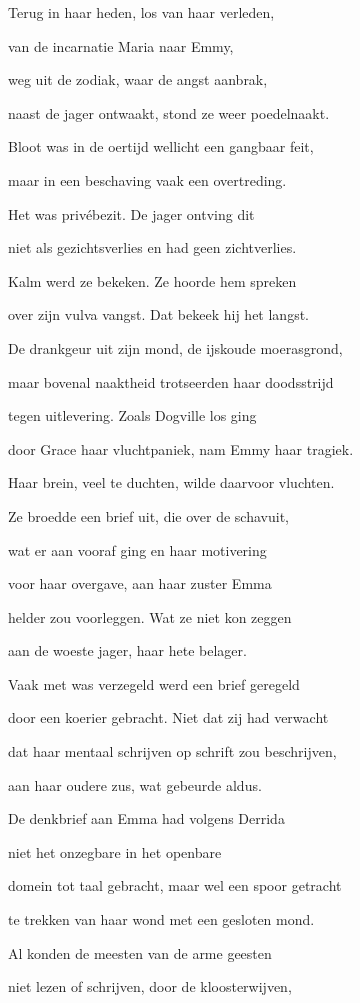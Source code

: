 Terug in haar heden,
los van haar verleden,

van de incarnatie
Maria naar Emmy,

weg uit de zodiak,
waar de angst aanbrak,

naast de jager ontwaakt,
stond ze weer poedelnaakt.

Bloot was in de oertijd
wellicht een gangbaar feit,

maar in een beschaving
vaak een overtreding.

Het was privébezit.
De jager ontving dit

niet als gezichtsverlies
en had geen zichtverlies.

Kalm werd ze bekeken.
Ze hoorde hem spreken

over zijn vulva vangst.
Dat bekeek hij het langst.

De drankgeur uit zijn mond,
de ijskoude moerasgrond,

maar bovenal naaktheid
trotseerden haar doodsstrijd

tegen uitlevering.
Zoals Dogville los ging

door Grace haar vluchtpaniek,
nam Emmy haar tragiek.

Haar brein, veel te duchten,
wilde daarvoor vluchten.

Ze broedde een brief uit,
die over de schavuit,

wat er aan vooraf ging
en haar motivering

voor haar overgave,
aan haar zuster Emma

helder zou voorleggen.
Wat ze niet kon zeggen

aan de woeste jager,
haar hete belager.

Vaak met was verzegeld
werd een brief geregeld

door een koerier gebracht.
Niet dat zij had verwacht

dat haar mentaal schrijven
op schrift zou beschrijven,

aan haar oudere zus,
wat gebeurde aldus.

De denkbrief aan Emma
had volgens Derrida

niet het onzegbare
in het openbare

domein tot taal gebracht,
maar wel een spoor getracht

te trekken van haar wond
met een gesloten mond.

Al konden de meesten
van de arme geesten

niet lezen of schrijven,
door de kloosterwijven,

